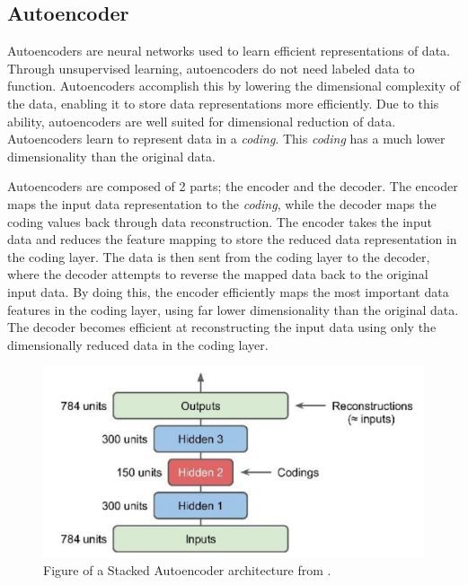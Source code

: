
\subsection{Autoencoder}

Autoencoders are neural networks used to learn efficient representations of data.
Through unsupervised learning, autoencoders do not need labeled data to function.
Autoencoders accomplish this by lowering the dimensional complexity of the data, enabling it to store data representations more efficiently.
Due to this ability, autoencoders are well suited for dimensional reduction of data.
Autoencoders learn to represent data in a \textit{coding}.
This \textit{coding} has a much lower dimensionality than the original data.
\cite[p.~506-508]{Geron2017}

Autoencoders are composed of 2 parts; the encoder and the decoder.
The encoder maps the input data representation to the \textit{coding}, while the decoder maps the coding values back through data reconstruction.
The encoder takes the input data and reduces the feature mapping to store the reduced data representation in the coding layer.
The data is then sent from the coding layer to the decoder, where the decoder attempts to reverse the mapped data back to the original input data.
By doing this, the encoder efficiently maps the most important data features in the coding layer, using far lower dimensionality than the original data.
The decoder becomes efficient at reconstructing the input data using only the dimensionally reduced data in the coding layer.
\cite[p.~506-508]{Geron2017}


\begin{figure}[h!]
    \centering
    \includegraphics[width=\textwidth]{./sections/BT/figures/stacked_autoencoder_hands_on.png}
    \hfill
    \caption{Figure of a Stacked Autoencoder architecture from \cite[p.~511]{Geron2017}.}
    \label{fig:stacked_autoencoder_arch}
\end{figure}

